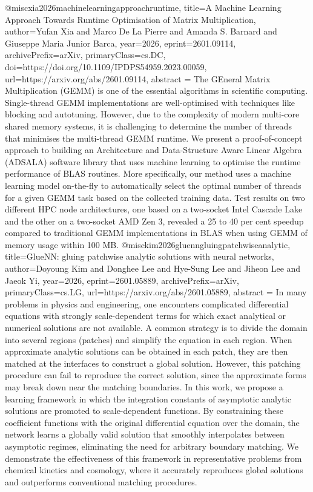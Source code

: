 {}@misc{xia2026machinelearningapproachruntime,
      title={A Machine Learning Approach Towards Runtime Optimisation of Matrix Multiplication}, 
      author={Yufan Xia and Marco De La Pierre and Amanda S. Barnard and Giuseppe Maria Junior Barca},
      year={2026},
      eprint={2601.09114},
      archivePrefix={arXiv},
      primaryClass={cs.DC},
      doi={https://doi.org/10.1109/IPDPS54959.2023.00059},
      url={https://arxiv.org/abs/2601.09114},
      abstract = {The GEneral Matrix Multiplication (GEMM) is one of the essential algorithms in scientific computing. Single-thread GEMM implementations are well-optimised with techniques like blocking and autotuning. However, due to the complexity of modern multi-core shared memory systems, it is challenging to determine the number of threads that minimises the multi-thread GEMM runtime. We present a proof-of-concept approach to building an Architecture and Data-Structure Aware Linear Algebra (ADSALA) software library that uses machine learning to optimise the runtime performance of BLAS routines. More specifically, our method uses a machine learning model on-the-fly to automatically select the optimal number of threads for a given GEMM task based on the collected training data. Test results on two different HPC node architectures, one based on a two-socket Intel Cascade Lake and the other on a two-socket AMD Zen 3, revealed a 25 to 40 per cent speedup compared to traditional GEMM implementations in BLAS when using GEMM of memory usage within 100 MB.}
}@misc{kim2026gluenngluingpatchwiseanalytic,
      title={GlueNN: gluing patchwise analytic solutions with neural networks}, 
      author={Doyoung Kim and Donghee Lee and Hye-Sung Lee and Jiheon Lee and Jaeok Yi},
      year={2026},
      eprint={2601.05889},
      archivePrefix={arXiv},
      primaryClass={cs.LG},
      url={https://arxiv.org/abs/2601.05889},
      abstract = {In many problems in physics and engineering, one encounters complicated differential equations with strongly scale-dependent terms for which exact analytical or numerical solutions are not available. A common strategy is to divide the domain into several regions (patches) and simplify the equation in each region. When approximate analytic solutions can be obtained in each patch, they are then matched at the interfaces to construct a global solution. However, this patching procedure can fail to reproduce the correct solution, since the approximate forms may break down near the matching boundaries. In this work, we propose a learning framework in which the integration constants of asymptotic analytic solutions are promoted to scale-dependent functions. By constraining these coefficient functions with the original differential equation over the domain, the network learns a globally valid solution that smoothly interpolates between asymptotic regimes, eliminating the need for arbitrary boundary matching. We demonstrate the effectiveness of this framework in representative problems from chemical kinetics and cosmology, where it accurately reproduces global solutions and outperforms conventional matching procedures.}
}

